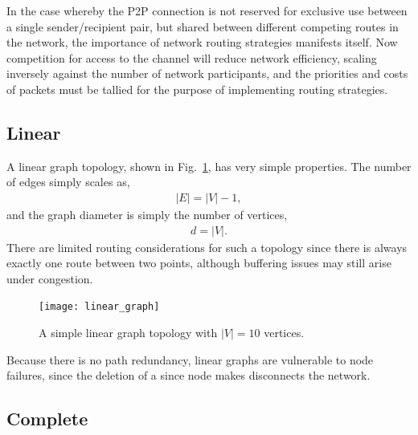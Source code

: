 In the case whereby the P2P connection is not reserved for exclusive use between a single sender/recipient pair, but shared between different competing routes in the network, the importance of network routing strategies manifests itself. Now competition for access to the channel will reduce network efficiency, scaling inversely against the number of network participants, and the priorities and costs of packets must be tallied for the purpose of implementing routing strategies.

%
%

\subsection{Linear}\label{sec:linear_topol}

A linear graph topology, shown in Fig.~\ref{fig:linear_graph}, has very simple properties. The number of edges simply scales as,
\begin{align}
|E|=|V|-1,	
\end{align}
and the graph diameter is simply the number of vertices,
\begin{align}
d = |V|.	
\end{align}
There are limited routing considerations for such a topology since there is always exactly one route between two points, although buffering issues may still arise under congestion.

\begin{figure}[!htbp]
\texttt{[image: linear\_graph]}
\caption{A simple linear graph topology with \mbox{$|V|=10$} vertices.}\label{fig:linear_graph}
\end{figure}

Because there is no path redundancy, linear graphs are vulnerable to node failures, since the deletion of a since node makes disconnects the network.

%
%

\subsection{Complete}\label{sec:complete_topol} 

